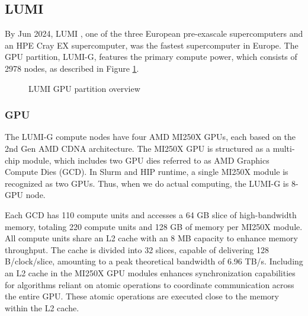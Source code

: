 \subsection{LUMI}
\label{subsec:lumi}
By Jun 2024, LUMI \cite{lumi}, one of the three European pre-exascale supercomputers and an HPE Cray EX supercomputer, was the fastest supercomputer in Europe. The GPU partition, LUMI-G, features the primary compute power, which consists of 2978 nodes, as described in Figure \ref{fig_lumig_overview}.

\begin{figure}[H]
    \centering
    \caption{LUMI GPU partition overview \cite{lumi}}
    \label{fig_lumig_overview}
\end{figure}

\subsubsection{GPU}

The LUMI-G compute nodes have four AMD MI250X GPUs, each based on the 2nd Gen AMD CDNA architecture. The MI250X GPU is structured as a multi-chip module, which includes two GPU dies referred to as AMD Graphics Compute Dies (GCD). In Slurm and HIP runtime, a single MI250X module is recognized as two GPUs. Thus, when we do actual computing, the LUMI-G is 8-GPU node.

Each GCD has 110 compute units and accesses a 64 GB slice of high-bandwidth memory, totaling 220 compute units and 128 GB of memory per MI250X module. All compute units share an L2 cache with an 8 MB capacity to enhance memory throughput. The cache is divided into 32 slices, capable of delivering 128 B/clock/slice, amounting to a peak theoretical bandwidth of 6.96 TB/s. Including an L2 cache in the MI250X GPU modules enhances synchronization capabilities for algorithms reliant on atomic operations to coordinate communication across the entire GPU. These atomic operations are executed close to the memory within the L2 cache.



